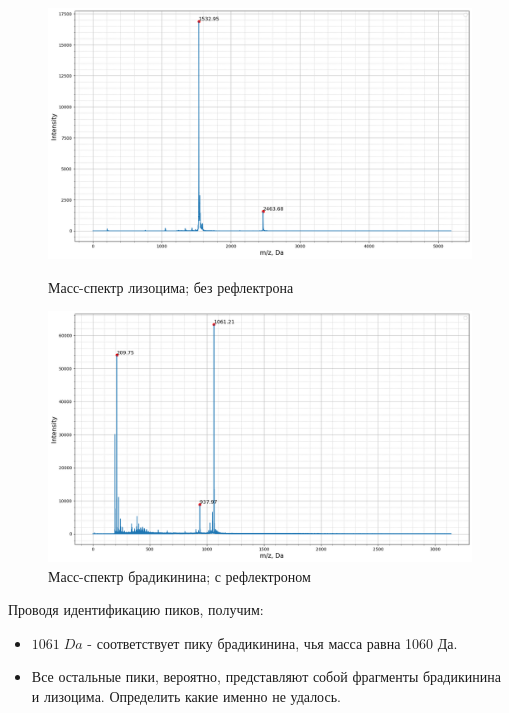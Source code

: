 \documentclass{article}
\begin{document}
\begin{figure}[h!] 
        \centering
        \centering
            \includegraphics[width=0.9\linewidth]{Images/e23_lisocim.png}
                 \caption{Масс-спектр лизоцима; без рефлектрона}
                 \label{Лизоцим}
        \endminipage\hfill
        \centering
             \includegraphics[width=0.9\linewidth]{Images/f21_bradikinin.png}
                 \caption{Масс-спектр брадикинина; с рефлектроном}
                 \label{Брадикинин}
        \endminipage
\end{figure}

Проводя идентификацию пиков, получим:
\begin{itemize}
    \item $1061 \; Da$ - соответствует пику брадикинина, чья масса равна 1060 Да.
    \item Все остальные пики, вероятно, представляют собой фрагменты брадикинина и лизоцима. Определить какие именно не удалось.
\end{itemize}
\newpage
\end{document}
